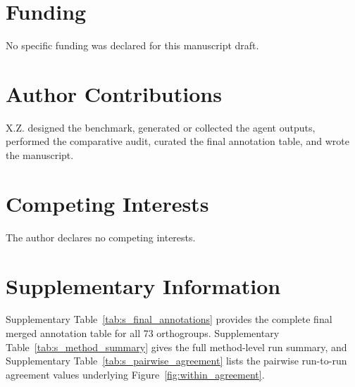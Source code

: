 \documentclass[11pt]{article}
\begin{document}
\section{Funding}

No specific funding was declared for this manuscript draft.

\section{Author Contributions}

X.Z. designed the benchmark, generated or collected the agent outputs, performed the comparative audit, curated the final annotation table, and wrote the manuscript.

\section{Competing Interests}

The author declares no competing interests.




\clearpage
\appendix
\singlespacing
\renewcommand{\thetable}{S\arabic{table}}
\renewcommand{\thefigure}{S\arabic{figure}}
\renewcommand{\theHtable}{S\arabic{table}}
\renewcommand{\theHfigure}{S\arabic{figure}}
\setcounter{table}{0}
\setcounter{figure}{0}

\section*{Supplementary Information}

Supplementary Table~\ref{tab:s_final_annotations} provides the complete final merged annotation table for all 73 orthogroups. Supplementary Table~\ref{tab:s_method_summary} gives the full method-level run summary, and Supplementary Table~\ref{tab:s_pairwise_agreement} lists the pairwise run-to-run agreement values underlying Figure~\ref{fig:within_agreement}.






\end{document}
